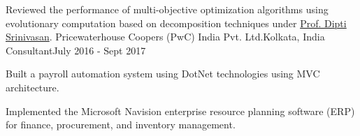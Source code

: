 \documentclass[letterpaper,10pt]{article}
\begin{document}
\resumeItemListStart
\item {Reviewed the performance of multi-objective optimization algorithms using evolutionary computation based on decomposition techniques under \href{https://www.ece.nus.edu.sg/gems/profhome.html}{Prof. Dipti Srinivasan}.}
\resumeItemListEnd
\resumeSubheading
{Pricewaterhouse Coopers (PwC) India Pvt. Ltd.}{Kolkata, India}
{Consultant}{July 2016 - Sept 2017}
\resumeItemListStart
\item {Built a payroll automation system using DotNet technologies using MVC architecture.}
\item {Implemented the Microsoft Navision enterprise resource planning software (ERP) for finance, procurement, and inventory management.}
\resumeItemListEnd
\resumeSubHeadingListEnd

\end{document}
